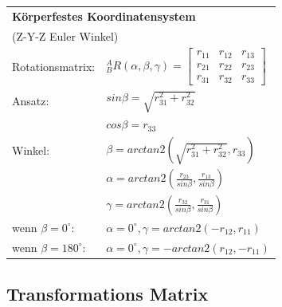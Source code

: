 	\begin{minipage}{9.5cm}
    	\begin{tabular}{|p{2.5cm}|p{6cm}|}
        \hline
        	\multicolumn{2}{|l|}{\textbf{Körperfestes Koordinatensystem}}\\
        	\multicolumn{2}{|l|}{(Z-Y-Z Euler Winkel)}\\
        \hline
        	Rotationsmatrix:
    		& ${^A_B}R(\alpha,\beta,\gamma) = 
    			\begin{bmatrix} 
			    	r_{11} & r_{12} & r_{13} \\
			        r_{21} & r_{22} & r_{23} \\
			        r_{31} & r_{32} & r_{33}                              
			    \end{bmatrix}$ \\
		\hline
			Ansatz:
			& $sin\beta = \sqrt{r^2_{31} + r^2_{32}}$ \\
			& $cos\beta = r_{33}$\\
		\hline
			Winkel:
			& $\beta=arctan2(\sqrt{r^2_{31}+r^2_{32}},r_{33})$\\
			& $\alpha=arctan2(\frac{r_{23}}{sin\beta},\frac{r_{13}}{sin\beta})$\\
			& $\gamma=arctan2(\frac{r_{32}}{sin\beta},\frac{r_{31}}{sin\beta})$\\
		\hline
			wenn $\beta=0^{\circ}$:
			& $\alpha=0^{\circ},\gamma=arctan2(-r_{12},r_{11})$\\
			wenn $\beta=180^{\circ}$:
			& $\alpha=0^{\circ},\gamma=-arctan2(r_{12},-r_{11})$\\
		\hline
        \end{tabular}
    	

    	
    \end{minipage}
	
	\newpage
	\subsection{Transformations Matrix}
